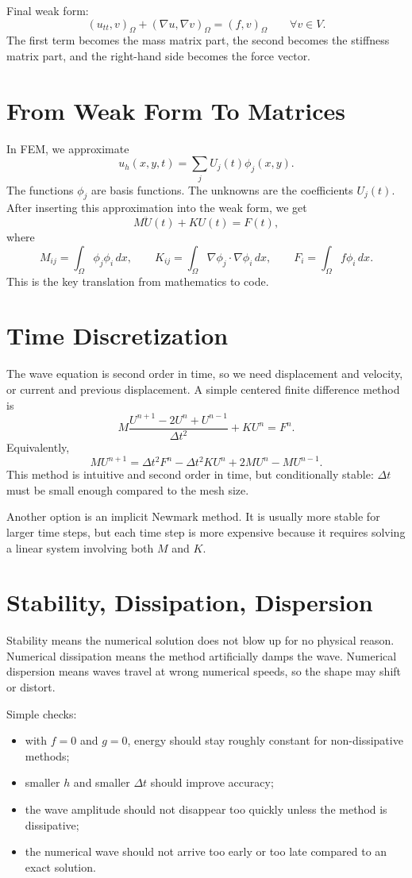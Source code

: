 \documentclass[11pt,a4paper]{article}
\begin{document}
Final weak form:
\[
(u_{tt},v)_\Omega + (\nabla u,\nabla v)_\Omega = (f,v)_\Omega
\qquad \forall v \in V.
\]
The first term becomes the mass matrix part, the second becomes the stiffness matrix part,
and the right-hand side becomes the force vector.

\section{From Weak Form To Matrices}
In FEM, we approximate
\[
u_h(x,y,t) = \sum_j U_j(t)\phi_j(x,y).
\]
The functions \(\phi_j\) are basis functions. The unknowns are the coefficients \(U_j(t)\).
After inserting this approximation into the weak form, we get
\[
M\ddot U(t) + K U(t) = F(t),
\]
where
\[
M_{ij} = \int_\Omega \phi_j\phi_i\,dx,
\qquad
K_{ij} = \int_\Omega \nabla\phi_j \cdot \nabla\phi_i\,dx,
\qquad
F_i = \int_\Omega f\phi_i\,dx.
\]
This is the key translation from mathematics to code.

\section{Time Discretization}
The wave equation is second order in time, so we need displacement and velocity, or current
and previous displacement. A simple centered finite difference method is
\[
M\frac{U^{n+1}-2U^n+U^{n-1}}{\Delta t^2} + K U^n = F^n.
\]
Equivalently,
\[
M U^{n+1}
=
\Delta t^2 F^n
-\Delta t^2 K U^n
+2MU^n
-MU^{n-1}.
\]
This method is intuitive and second order in time, but conditionally stable: \(\Delta t\)
must be small enough compared to the mesh size.

Another option is an implicit Newmark method. It is usually more stable for larger time steps,
but each time step is more expensive because it requires solving a linear system involving
both \(M\) and \(K\).

\section{Stability, Dissipation, Dispersion}
Stability means the numerical solution does not blow up for no physical reason.
Numerical dissipation means the method artificially damps the wave. Numerical dispersion means
waves travel at wrong numerical speeds, so the shape may shift or distort.

Simple checks:
\begin{itemize}
\item with \(f=0\) and \(g=0\), energy should stay roughly constant for non-dissipative methods;
\item smaller \(h\) and smaller \(\Delta t\) should improve accuracy;
\item the wave amplitude should not disappear too quickly unless the method is dissipative;
\item the numerical wave should not arrive too early or too late compared to an exact solution.
\end{itemize}
\end{document}
